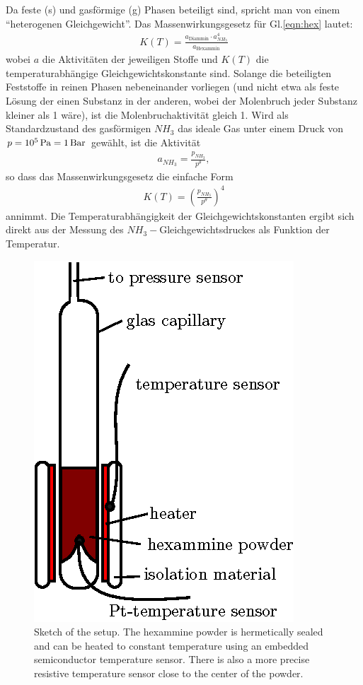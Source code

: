 \documentclass[english,twocolumn,DIV21,a4,10pt]{scrartcl}
\begin{document}
Da feste (s) und gasförmige (g) Phasen beteiligt sind, spricht man von
einem ``heterogenen Gleichgewicht''.  Das Massenwirkungsgesetz für
Gl.\eqref{eqn:hex} lautet:
\begin{align}
  K(T) = \frac{a_\textrm{Diammin} \cdot a^4_{NH_3}}{a_\textrm{Hexammin}}
\end{align}
wobei $a$ die  Aktivit\"aten der
jeweiligen Stoffe und $K(T)$ die temperaturabhängige
Gleichgewichtskonstante sind. Solange die beteiligten Feststoffe in
reinen Phasen nebeneinander vorliegen (und nicht etwa als feste
L\"osung der einen Substanz in der anderen, wobei der Molenbruch jeder
Substanz kleiner als 1 w\"are), ist die Molenbruchaktivit\"at gleich
1.  Wird als Standardzustand des gasförmigen $NH_3$ das ideale Gas
unter einem Druck von $p = \unit[10^5]{Pa} = \unit[1]{Bar}$ gewählt,
ist die Aktivit\"at
\begin{align}
  a_{NH_3}=\frac{p_{NH_3}}{p^\theta},
\end{align}
so dass das Massenwirkungsgesetz die einfache Form
\begin{align}
  K(T)=\left(\frac{p_{NH_3}}{p^\theta}\right)^4
\end{align}
annimmt. Die Temperaturabhängigkeit der Gleichgewichtskonstanten
ergibt sich direkt aus der Messung des $NH_3-$Gleichgewichtsdruckes
als Funktion der Temperatur.

\begin{figure}
  \centering
  \includegraphics{kapillare.eps}
  \caption{Sketch of the setup. The hexammine powder is hermetically
    sealed and can be heated to constant temperature using an embedded
    semiconductor temperature sensor. There is also a more precise
    resistive temperature sensor close to the center of the powder.}
   \label{fig:kapillare}
 \end{figure}
\end{document}
